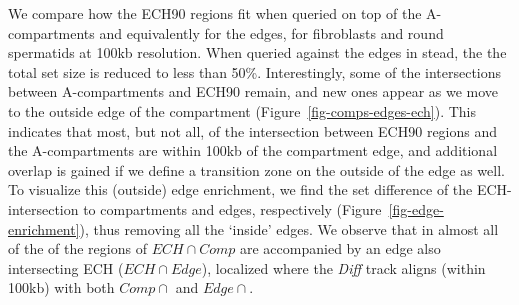 \documentclass[
  11pt,
  a4paper,
]{scrbook}
\let\oldemph\emph
\renewcommand\emph[1]{\oldemph{\color{gray}#1}}
\begin{document}
We compare how the ECH90 regions fit when queried on top of the
A-compartments and equivalently for the edges, for fibroblasts and round
spermatids at 100kb resolution. When queried against the edges in stead,
the the total set size is reduced to less than 50\%. Interestingly, some
of the intersections between A-compartments and ECH90 remain, and new
ones appear as we move to the outside edge of the compartment
(Figure~\ref{fig-comps-edges-ech}). This indicates that most, but not
all, of the intersection between ECH90 regions and the A-compartments
are within 100kb of the compartment edge, and additional overlap is
gained if we define a transition zone on the outside of the edge as
well. To visualize this (outside) edge enrichment, we find the set
difference of the ECH-intersection to compartments and edges,
respectively (Figure~\ref{fig-edge-enrichment}), thus removing all the
`inside' edges. We observe that in almost all of the of the regions of
\(ECH \cap Comp\) are accompanied by an edge also intersecting ECH
(\(ECH \cap Edge\)), localized where the \emph{Diff} track aligns
(within 100kb) with both \(Comp \cap\) and \(Edge \cap\).
\end{document}
